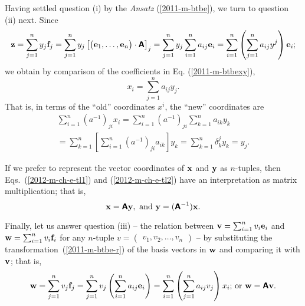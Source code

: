 Having settled question (i) by the {\it Ansatz}
(\ref{2011-m-btbe}),
we turn to question (ii) next.
Since
\begin{equation}
{\bf z} =
 \sum_{j=1}^n y_j {\bf f}_j=
 \sum_{j=1}^n  y_j \left[\begin{pmatrix}{\bf e}_1,\ldots ,{\bf e}_n\end{pmatrix} \cdot \textsf{\textbf{A}}\right]_j=
 \sum_{j=1}^n  y_j  \sum_{i=1}^n a_{ij} {\bf e}_i=
  \sum_{i=1}^n \left(\sum_{j=1}^n  a_{ij} y^j \right)   {\bf e}_i;
\end{equation}
we obtain by comparison of the coefficients in Eq. (\ref{2011-m-btbexy}),
\begin{equation}
x_i= \sum_{j=1}^n a_{ij} y_j.
\label{2012-m-ch-e-tl1}
\end{equation}
That is, in terms of the ``old'' coordinates $x^i$,
the ``new'' coordinates are
\begin{equation}
\begin{split}
\sum_{i=1}^n (a^{-1})_{ji} x_i= \sum_{i=1}^n (a^{-1})_{ji}  \sum_{k=1}^n  a_{ik} y_k \\
=  \sum_{k=1}^n \left[ \sum_{i=1}^n (a^{-1})_{ji}  a_{ik} \right] y_k
=   \sum_{k=1}^n \delta^j_k y_k
=  y_j
.
\label{2012-m-ch-e-tl2}
\end{split}
\end{equation}

If we prefer to represent the vector coordinates of
${\bf x}$ and ${\bf y}$ as $n$-tuples,
then Eqs.~(\ref{2012-m-ch-e-tl1})  and (\ref{2012-m-ch-e-tl2})
have an interpretation as matrix multiplication; that is,
\begin{equation}
{\bf x} =  \textsf{\textbf{A}}{\bf y}, {\text{ and }}
{\bf y} =  (\textsf{\textbf{A}}^{-1}){\bf x}
.
\label{2012-m-ch-e-tl3}
\end{equation}

Finally, let us answer question (iii)
-- the relation between ${\bf v}=\sum_{i=1}^n v_i {\bf e}_i$ and ${\bf w}=\sum_{i=1}^n v_i {\bf f}_i$ for any $n$-tuple
$v = \begin{pmatrix} v_1, v_2, \ldots , v_n \end{pmatrix}$ --
by substituting the transformation~(\ref{2011-m-btbe-r}) of the basis vectors in ${\bf w}$ and comparing it with ${\bf v}$; that is,
\begin{equation}
{\bf w}= \sum_{j=1}^n v_j {\bf f}_j  = \sum_{j=1}^n v_j \left( \sum_{i=1}^n a_{ij} {\bf e}_i \right)= \sum_{i=1}^n \left( \sum_{j=1}^n a_{ij}  v_j \right)  x_i
\textrm{;  or } {\bf w} = \textsf{\textbf{A}} {\bf v}.
\end{equation}

